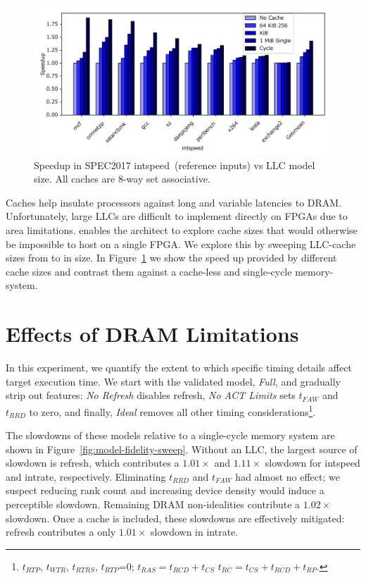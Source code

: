 \begin{figure}[t]
    \centering
    \includegraphics[width=\columnwidth]{figures/cache_size_bar_plot.pdf}
    \caption{Speedup in SPEC2017 intspeed~(reference inputs) vs LLC model size. All caches are 8-way set associative.}
    \label{fig:llc-speedup}
\end{figure}

Caches help insulate processors against long and variable latencies to DRAM.
Unfortunately, large LLCs are difficult to implement directly on FPGAs due to
area limitations. \PNAME enables the architect to explore cache sizes that
would otherwise be impossible to host on a single FPGA. We explore this by
sweeping LLC-cache sizes from  to  in size. In
Figure~\ref{fig:llc-speedup} we show the speed up provided by different cache
sizes and contrast them against a cache-less and single-cycle memory-system.

\section{Effects of DRAM Limitations}

In this experiment, we quantify the extent to which specific timing details
affect target execution time. We start with the validated model, \emph{Full}, and
gradually strip out features: \emph{No Refresh} disables refresh, \emph{No ACT
Limits} sets $t_{FAW}$ and $t_{RRD}$ to zero, and finally, \emph{Ideal} removes
all other timing considerations\footnote{$t_{RTP}$, $t_{WTR}$,
$t_{RTRS}$, $t_{RTP}$=0; $t_{RAS} = t_{RCD} + t_{CS}$ $t_{RC} =
t_{CS} + t_{RCD} + t_{RP}$.}.

The slowdowns of these models relative to a single-cycle memory system are
shown in Figure~\ref{fig:model-fidelity-sweep}. Without an LLC, the largest
source of slowdown is refresh, which contributes a $1.01\times$ and
$1.11\times$ slowdown for intspeed and intrate, respectively.  Eliminating $t_{RRD}$ and $t_{FAW}$ had almost no effect; we
suspect reducing rank count and increasing device density would induce a perceptible slowdown.
Remaining DRAM non-idealities contribute a $1.02\times$ slowdown.  Once
a cache is included, these slowdowns are effectively mitigated: refresh
contributes a only $1.01\times$ slowdown in intrate.

